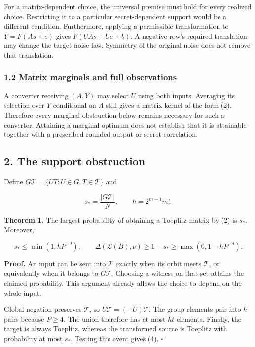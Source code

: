 \documentclass[
]{article}
\begin{document}
For a matrix-dependent choice, the universal premise must hold for every
realized choice. Restricting it to a particular secret-dependent support
would be a different condition. Furthermore, applying a permissible
transformation to \(Y=F(As+e)\) gives \(F(UAs+Ue+b)\). A negative row's
required translation may change the target noise law. Symmetry of the
original noise does not remove that translation.

\subsubsection{1.2 Matrix marginals and full
observations}\label{matrix-marginals-and-full-observations}

A converter receiving \((A,Y)\) may select \(U\) using both inputs.
Averaging its selection over \(Y\) conditional on \(A\) still gives a
matrix kernel of the form (2). Therefore every marginal obstruction
below remains necessary for such a converter. Attaining a marginal
optimum does not establish that it is attainable together with a
prescribed rounded output or secret correlation.

\subsection{2. The support obstruction}\label{the-support-obstruction}

Define \(G\mathcal T=\{UT:U\in G,T\in\mathcal T\}\) and

\[
s_* =\frac{|G\mathcal T|}{N},\qquad h=2^{m-1}m!.
\]

\textbf{Theorem 1.} The largest probability of obtaining a Toeplitz
matrix by (2) is \(s_*\). Moreover,

\[
s_*\le\min(1,hP^{-d}),\qquad
\Delta(\mathcal L(B),\nu)\ge1-s_*\ge\max(0,1-hP^{-d}).
\tag{4}
\]

\textbf{Proof.} An input can be sent into \(\mathcal T\) exactly when
its orbit meets \(\mathcal T\), or equivalently when it belongs to
\(G\mathcal T\). Choosing a witness on that set attains the claimed
probability. This argument already allows the choice to depend on the
whole input.

Global negation preserves \(\mathcal T\), so
\(U\mathcal T=(-U)\mathcal T\). The group elements pair into \(h\) pairs
because \(P\ge4\). The union therefore has at most \(ht\) elements.
Finally, the target is always Toeplitz, whereas the transformed source
is Toeplitz with probability at most \(s_*\). Testing this event gives
(4). \(\square\)
\end{document}
